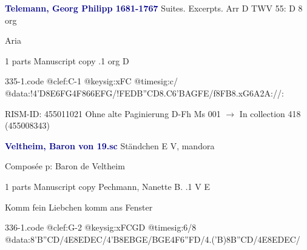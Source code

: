 \documentclass[twocolumn]{book}
\begin{document}
\newline \par \vspace{7pt} \textcolor{darkblue}{\textbf{Telemann, Georg Philipp  1681-1767}}
\newline Suites. Excerpts. Arr  D  TWV 55: D 8
\newline org
\newline \begin{itshape}[f.116r, heading:] Aria\end{itshape} 
\newline \textcolor{darkblue}{}  1 parts  
\newline Manuscript copy
.1  org  D  
\begin{filecontents*}{335-1.code}
@clef:C-1
@keysig:xFC
@timesig:c/
@data:!4'D{8E6FG}4F{866EFG}/!{FED}{B''CD}{8.C6'B}{AGFE}/f{8FB}{8.xG6A}2A://:
\end{filecontents*}
\newline
%

\newline RISM-ID: 455011021
\newline Ohne alte Paginierung
\newline D-Fh  Ms 001
\newline $\rightarrow$ In collection 418 (455008343)

\newline \par \vspace{7pt} \textcolor{darkblue}{\textbf{Veltheim, Baron von  19.sc}}
\newline Ständchen  E  
\newline V, mandora
\newline \begin{itshape}[heading, f.41v:] Composée p: Baron de Veltheim\end{itshape} 
\newline \textcolor{darkblue}{}  1 parts  
\newline Manuscript copy
\newline Pechmann, Nanette B.
.1  V  E
\newline \begin{footnotesize} Komm fein Liebchen komm ans Fenster \end{footnotesize}  
\begin{filecontents*}{336-1.code}
@clef:G-2
@keysig:xFCGD
@timesig:6/8
@data:{8'B''C}D/4E8E{DE}C/4'B8E{BG}E/{BG}E4F{6''FD}/4.('B){8B''C}D/4E8E{DE}C/
\end{filecontents*}
\newline
%
\end{document}
